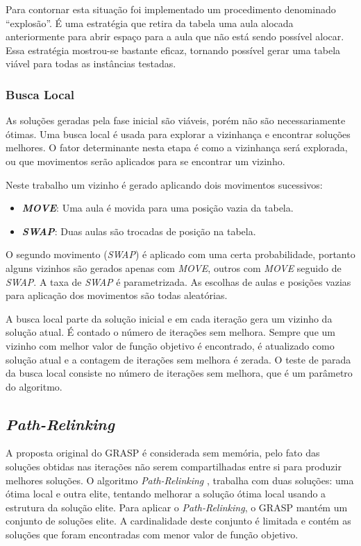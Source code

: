 \documentclass[11pt]{article}
\begin{document}
Para contornar esta situação foi implementado um procedimento denominado “explosão”. É uma estratégia que retira da tabela uma aula alocada anteriormente para abrir espaço para a aula que não está sendo possível alocar. Essa estratégia mostrou-se bastante eficaz, tornando possível gerar uma tabela viável para todas as instâncias testadas.

\subsubsection{Busca Local}

As soluções geradas pela fase inicial são viáveis, porém não são necessariamente ótimas. Uma busca local é usada para explorar a vizinhança e encontrar soluções melhores. O fator determinante nesta etapa é como a vizinhança será explorada, ou que movimentos serão aplicados para se encontrar um vizinho.

Neste trabalho um vizinho é gerado aplicando dois movimentos sucessivos:

\begin{itemize}
\item \textit{\textbf{MOVE}}: Uma aula é movida para uma posição vazia da tabela.
\item \textit{\textbf{SWAP}}: Duas aulas são trocadas de posição na tabela.
\end{itemize}

O segundo movimento (\textit{SWAP}) é aplicado com uma certa probabilidade, portanto alguns vizinhos são gerados apenas com \textit{MOVE}, outros com \textit{MOVE} seguido de \textit{SWAP}. A taxa de \textit{SWAP} é parametrizada. As escolhas de aulas e posições vazias para aplicação dos movimentos são todas aleatórias.

A busca local parte da solução inicial e em cada iteração gera um vizinho da solução atual. É contado o número de iterações sem melhora. Sempre que um vizinho com melhor valor de função objetivo é encontrado, é atualizado como solução atual e a contagem de iterações sem melhora é zerada. O teste de parada da busca local consiste no número de iterações sem melhora, que é um parâmetro do algoritmo. 

\subsection{\textit{Path-Relinking}}

A proposta original do GRASP é considerada sem memória, pelo fato das soluções obtidas nas iterações não serem compartilhadas entre si para produzir melhores soluções. O algoritmo \textit{Path-Relinking} \cite{Glover96tabusearch}, \cite{pathRelinking} trabalha com duas soluções: uma ótima local e outra elite, tentando melhorar a solução ótima local usando a estrutura da solução elite. Para aplicar o \textit{Path-Relinking}, o GRASP mantém um conjunto de soluções elite. A cardinalidade deste conjunto é limitada e contém as soluções que foram encontradas com menor valor de função objetivo.
\end{document}

